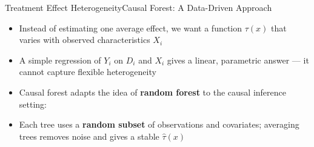 \documentclass[hyperref={pdfpagelabels=false}]{beamer}
\begin{document}
\begin{frame}{Treatment Effect Heterogeneity}{Causal Forest: A Data-Driven Approach}
\begin{itemize}
  \item Instead of estimating one average effect, we want a function $\tau(x)$ that varies with observed characteristics $X_i$
  \vspace{0.2cm}
  \item A simple regression of $Y_i$ on $D_i$ and $X_i$ gives a linear, parametric answer --- it cannot capture flexible heterogeneity
  \vspace{0.2cm}
  \item Causal forest adapts the idea of \textbf{random forest} to the causal inference setting:
\end{itemize}
\vspace{0.15cm}
\begin{center}
\end{center}
\vspace{0.1cm}
\begin{itemize}
  \item Each tree uses a \textbf{random subset} of observations and covariates; averaging trees removes noise and gives a stable $\hat{\tau}(x)$
\end{itemize}
\end{frame}
\end{document}
